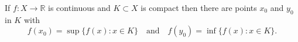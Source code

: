 If $f: X \to \mathbb{R}$ is continuous and $K \subset X$ is compact then there are points $x_0$ and $y_0$ in $K$ with
$$f(x_0) = \sup \{f(x): x \in K\} \quad \text{and} \quad f(y_0) = \inf \{f(x): x \in K\}.$$
